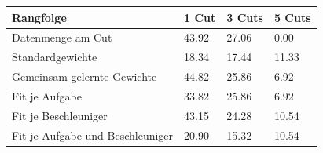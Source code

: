\begin{tabular}{@{}llll@{}}
\toprule
Rangfolge & 1 Cut & 3 Cuts & 5 Cuts \\
\midrule
Datenmenge am Cut & 43.92 & 27.06 & 0.00 \\
Standardgewichte & 18.34 & 17.44 & 11.33 \\
Gemeinsam gelernte Gewichte & 44.82 & 25.86 & 6.92 \\
Fit je Aufgabe & 33.82 & 25.86 & 6.92 \\
Fit je Beschleuniger & 43.15 & 24.28 & 10.54 \\
Fit je Aufgabe und Beschleuniger & 20.90 & 15.32 & 10.54 \\
\bottomrule
\end{tabular}
